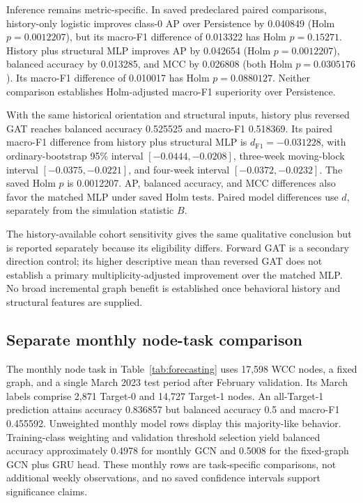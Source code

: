 \documentclass[11pt,a4paper]{article}
\begin{document}
Inference remains metric-specific. In saved predeclared paired comparisons, history-only logistic improves class-0 AP over Persistence by 0.040849 (Holm $p=0.0012207$), but its macro-F1 difference of 0.013322 has Holm $p=0.15271$. History plus structural MLP improves AP by 0.042654 (Holm $p=0.0012207$), balanced accuracy by 0.013285, and MCC by 0.026808 (both Holm $p=0.0305176$). Its macro-F1 difference of 0.010017 has Holm $p=0.0880127$. Neither comparison establishes Holm-adjusted macro-F1 superiority over Persistence.

With the same historical orientation and structural inputs, history plus reversed GAT reaches balanced accuracy 0.525525 and macro-F1 0.518369. Its paired macro-F1 difference from history plus structural MLP is $d_{\mathrm{F1}}=-0.031228$, with ordinary-bootstrap 95\% interval $[-0.0444,-0.0208]$, three-week moving-block interval $[-0.0375,-0.0221]$, and four-week interval $[-0.0372,-0.0232]$. The saved Holm $p$ is 0.0012207. AP, balanced accuracy, and MCC differences also favor the matched MLP under saved Holm tests. Paired model differences use $d$, separately from the simulation statistic $B$.

The history-available cohort sensitivity gives the same qualitative conclusion but is reported separately because its eligibility differs. Forward GAT is a secondary direction control; its higher descriptive mean than reversed GAT does not establish a primary multiplicity-adjusted improvement over the matched MLP. No broad incremental graph benefit is established once behavioral history and structural features are supplied.

\subsection{Separate monthly node-task comparison}
The monthly node task in Table~\ref{tab:forecasting} uses 17,598 WCC nodes, a fixed graph, and a single March 2023 test period after February validation. Its March labels comprise 2,871 Target-0 and 14,727 Target-1 nodes. An all-Target-1 prediction attains accuracy 0.836857 but balanced accuracy 0.5 and macro-F1 0.455592. Unweighted monthly model rows display this majority-like behavior. Training-class weighting and validation threshold selection yield balanced accuracy approximately 0.4978 for monthly GCN and 0.5008 for the fixed-graph GCN plus GRU head. These monthly rows are task-specific comparisons, not additional weekly observations, and no saved confidence intervals support significance claims.
\FloatBarrier
\end{document}
